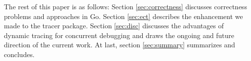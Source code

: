 The rest of this paper is as follows: Section \ref{sec:correctness} discusses correctness problems and approaches in Go. Section \ref{sec:ect} describes the enhancement we made to the tracer package. Section \ref{sec:disc} discusses the advantages of dynamic tracing for concurrent debugging and draws the ongoing and future direction of the current work. At last, section \ref{sec:summary} summarizes and concludes.

